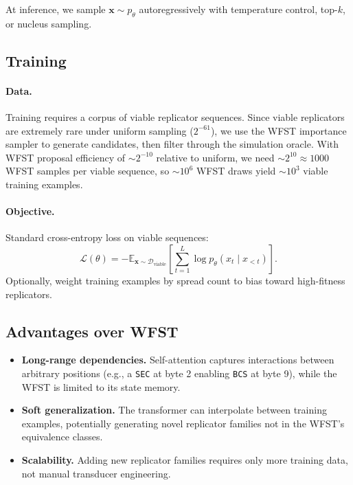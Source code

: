 \documentclass{article}
\newcommand{\opcode}[1]{\texttt{#1}}
\begin{document}
At inference, we sample $\mathbf{x} \sim p_\theta$ autoregressively with
temperature control, top-$k$, or nucleus sampling.

\subsection{Training}

\paragraph{Data.}
Training requires a corpus of viable replicator sequences.  Since viable
replicators are extremely rare under uniform sampling ($2^{-61}$), we use
the WFST importance sampler to generate candidates, then filter through the
simulation oracle.  With WFST proposal efficiency of ${\sim}2^{-10}$
relative to uniform, we need ${\sim}2^{10} \approx 1000$ WFST samples
per viable sequence, so ${\sim}10^6$ WFST draws yield ${\sim}10^3$ viable
training examples.

\paragraph{Objective.}
Standard cross-entropy loss on viable sequences:
\begin{equation}
  \mathcal{L}(\theta) = -\mathbb{E}_{\mathbf{x} \sim \mathcal{D}_{\text{viable}}}
    \left[\sum_{t=1}^{L} \log p_\theta(x_t \mid x_{<t})\right].
\end{equation}
Optionally, weight training examples by spread count to bias toward
high-fitness replicators.

\subsection{Advantages over WFST}

\begin{itemize}
  \item \textbf{Long-range dependencies.}  Self-attention captures interactions
        between arbitrary positions (e.g., a \opcode{SEC} at byte 2 enabling
        \opcode{BCS} at byte 9), while the WFST is limited to its state memory.
  \item \textbf{Soft generalization.}  The transformer can interpolate between
        training examples, potentially generating novel replicator families not
        in the WFST's equivalence classes.
  \item \textbf{Scalability.}  Adding new replicator families requires only
        more training data, not manual transducer engineering.
\end{itemize}
\end{document}
